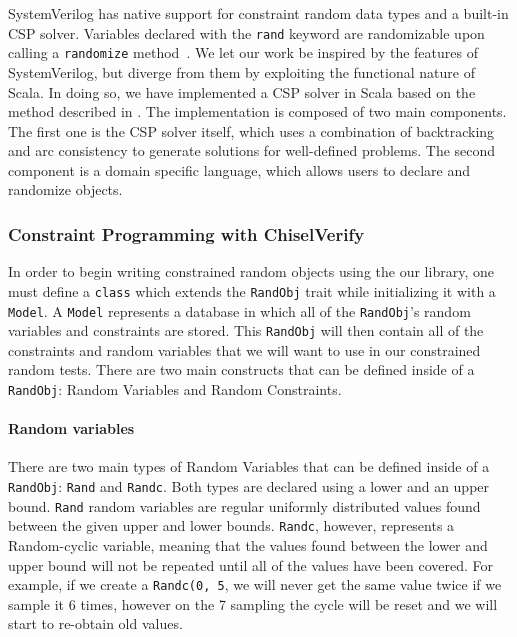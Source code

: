 \documentclass[conference]{IEEEtran}
\begin{document}
SystemVerilog has native support for constraint random data types and a built-in CSP solver. Variables declared with the \texttt{rand} keyword are randomizable upon calling a \texttt{randomize} method~\cite{spear2008systemverilog}. We let our work be inspired by the features of SystemVerilog, but diverge from them by exploiting the functional nature of Scala. In doing so, we have implemented a CSP solver in Scala based on the method described in \cite{russell2002artificial}. The implementation is composed of two main components. The first one is the CSP solver itself, which uses a combination of backtracking and arc consistency to generate solutions for well-defined problems. The second component is a domain specific language, which allows users to declare and randomize objects.

\subsubsection{Constraint Programming with ChiselVerify}
In order to begin writing constrained random objects using the our library, one must define a \texttt{class} which extends the \texttt{RandObj} trait while initializing it with a \texttt{Model}. A \texttt{Model} represents a database in which all of the \texttt{RandObj}'s random variables and constraints are stored. This \texttt{RandObj} will then contain all of the constraints and random variables that we will want to use in our constrained random tests. There are two main constructs that can be defined inside of a \texttt{RandObj}: Random Variables and Random Constraints.

\paragraph{Random variables} There are two main types of Random Variables that can be defined inside of a \texttt{RandObj}: \texttt{Rand} and \texttt{Randc}. Both types are declared using a lower and an upper bound. \texttt{Rand} random variables  are regular uniformly distributed values found between the given upper and lower bounds. \texttt{Randc}, however, represents a Random-cyclic variable, meaning that the values found between the lower and upper bound will not be repeated until all of the values have been covered. For example, if we create a \texttt{Randc(0, 5}, we will never get the same value twice if we sample it 6 times, however on the 7 sampling the cycle will be reset and we will start to re-obtain old values.
\end{document}
